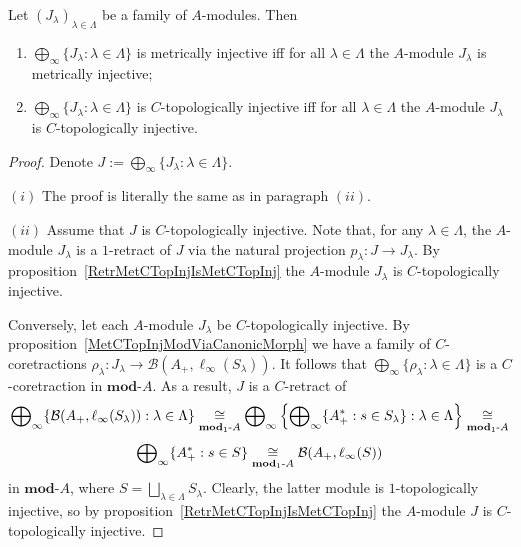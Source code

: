 \begin{proposition}\label{MetTopInjModProd} Let
${(J_\lambda)}_{\lambda\in\Lambda}$ be a family of $A$-modules. Then 

\begin{enumerate}[label = (\roman*)]
    \item $\bigoplus_\infty \{J_\lambda:\lambda\in\Lambda \}$ is metrically
    injective iff for all $\lambda\in\Lambda$ the $A$-module $J_\lambda$ is
    metrically injective;

    \item $\bigoplus_\infty \{J_\lambda:\lambda\in\Lambda \}$ is
    $C$-topologically injective iff for all $\lambda\in\Lambda$ the $A$-module
    $J_\lambda$ is $C$-topologically injective.
\end{enumerate}
\end{proposition}
\begin{proof} Denote $J:=\bigoplus_\infty \{J_\lambda:\lambda\in\Lambda \}$.

$(i)$ The proof is literally the same as in paragraph $(ii)$.

$(ii)$ Assume that $J$ is $C$-topologically injective. Note that, for any
$\lambda\in\Lambda$, the $A$-module $J_\lambda$ is a $1$-retract of $J$ via
the natural projection $p_\lambda:J\to J_\lambda$. By
proposition~\ref{RetrMetCTopInjIsMetCTopInj} the $A$-module $J_\lambda$ is
$C$-topologically injective.

Conversely, let each $A$-module $J_\lambda$ be $C$-topologically injective. By
proposition~\ref{MetCTopInjModViaCanonicMorph} we have a family of
$C$-coretractions
$\rho_\lambda:J_\lambda\to\mathcal{B}(A_+,\ell_\infty(S_\lambda))$. It follows
that $\bigoplus_\infty \{\rho_\lambda:\lambda\in\Lambda \}$ is a
$C$-coretraction in $\mathbf{mod}\text{-}A$. As a result, $J$ is a $C$-retract of 
\[
\bigoplus\nolimits_\infty \{
    \mathcal{B}(A_+,\ell_\infty(S_\lambda)):\lambda\in\Lambda
 \}
\mathrel{\mathop{\cong}\limits_{\mathbf{mod}_1\text{-}A}}
\bigoplus\nolimits_\infty\left \{
    \bigoplus\nolimits_\infty \{ A_+^*:s\in S_\lambda \}:\lambda\in\Lambda
\right \}
\mathrel{\mathop{\cong}\limits_{\mathbf{mod}_1\text{-}A}}
\]
\[
\bigoplus\nolimits_\infty \{A_+^*:s\in S \}
\mathrel{\mathop{\cong}\limits_{\mathbf{mod}_1\text{-}A}}
\mathcal{B}(A_+,\ell_\infty(S))
\]
in $\mathbf{mod}\text{-}A$, where $S=\bigsqcup_{\lambda\in\Lambda}S_\lambda$. Clearly,
the latter module is $1$-topologically injective, so by
proposition~\ref{RetrMetCTopInjIsMetCTopInj} the $A$-module $J$ is $C$-topologically
injective.
\end{proof}

